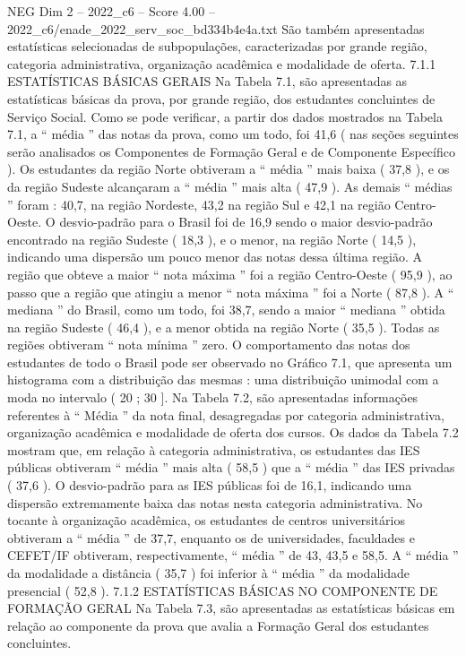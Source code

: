 \begin{textsample}{NEG Dim 2 – 2022\_c6 – Score 4.00 – 2022\_c6/enade\_2022\_serv\_soc\_bd334b4e4a.txt}
São também apresentadas estatísticas selecionadas de subpopulações, caracterizadas por grande região, categoria administrativa, organização acadêmica e modalidade de oferta. 7.1.1 ESTATÍSTICAS BÁSICAS GERAIS Na Tabela 7.1, são apresentadas as estatísticas básicas da prova, por grande região, dos estudantes concluintes de Serviço Social.
Como se pode verificar, a partir dos dados mostrados na Tabela 7.1, a “ média ” das notas da prova, como um todo, foi 41,6 ( nas seções seguintes serão analisados os Componentes de Formação Geral e de Componente Específico ).
Os estudantes da região Norte obtiveram a “ média ” mais baixa ( 37,8 ), e os da região Sudeste alcançaram a “ média ” mais alta ( 47,9 ).
As demais “ médias ” foram : 40,7, na região Nordeste, 43,2 na região Sul e 42,1 na região Centro-Oeste.
O desvio-padrão para o Brasil foi de 16,9 sendo o maior desvio-padrão encontrado na região Sudeste ( 18,3 ), e o menor, na região Norte ( 14,5 ), indicando uma dispersão um pouco menor das notas dessa última região.
A região que obteve a maior “ nota máxima ” foi a região Centro-Oeste ( 95,9 ), ao passo que a região que atingiu a menor “ nota máxima ” foi a Norte ( 87,8 ).
A “ mediana ” do Brasil, como um todo, foi 38,7, sendo a maior “ mediana ” obtida na região Sudeste ( 46,4 ), e a menor obtida na região Norte ( 35,5 ).
Todas as regiões obtiveram “ nota mínima ” zero.
O comportamento das notas dos estudantes de todo o Brasil pode ser observado no Gráfico 7.1, que apresenta um histograma com a distribuição das mesmas : uma distribuição unimodal com a moda no intervalo ( 20 ; 30 ].
Na Tabela 7.2, são apresentadas informações referentes à “ Média ” da nota final, desagregadas por categoria administrativa, organização acadêmica e modalidade de oferta dos cursos.
Os dados da Tabela 7.2 mostram que, em relação à categoria administrativa, os estudantes das IES públicas obtiveram “ média ” mais alta ( 58,5 ) que a “ média ” das IES privadas ( 37,6 ).
O desvio-padrão para as IES públicas foi de 16,1, indicando uma dispersão extremamente baixa das notas nesta categoria administrativa.
No tocante à organização acadêmica, os estudantes de centros universitários obtiveram a “ média ” de 37,7, enquanto os de universidades, faculdades e CEFET/IF obtiveram, respectivamente, “ média ” de 43, 43,5 e 58,5.
A “ média ” da modalidade a distância ( 35,7 ) foi inferior à “ média ” da modalidade presencial ( 52,8 ). 7.1.2 ESTATÍSTICAS BÁSICAS NO COMPONENTE DE FORMAÇÃO GERAL Na Tabela 7.3, são apresentadas as estatísticas básicas em relação ao componente da prova que avalia a Formação Geral dos estudantes concluintes.

\end{textsample}
